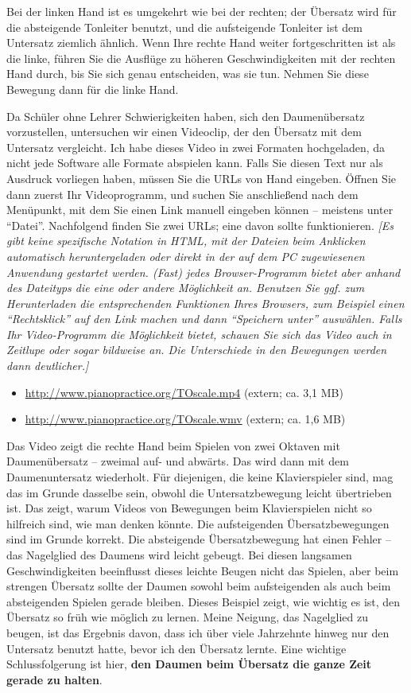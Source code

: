 Bei der linken Hand ist es umgekehrt wie bei der rechten; der Übersatz wird für die absteigende Tonleiter benutzt, und die aufsteigende Tonleiter ist dem Untersatz ziemlich ähnlich.
Wenn Ihre rechte Hand weiter fortgeschritten ist als die linke, führen Sie die Ausflüge zu höheren Geschwindigkeiten mit der rechten Hand durch, bis Sie sich genau entscheiden, was sie tun.
Nehmen Sie diese Bewegung dann für die linke Hand.

Da Schüler ohne Lehrer Schwierigkeiten haben, sich den Daumenübersatz vorzustellen, untersuchen wir einen Videoclip, der den Übersatz mit dem Untersatz vergleicht.
Ich habe dieses Video in zwei Formaten hochgeladen, da nicht jede Software alle Formate abspielen kann.
Falls Sie diesen Text nur als Ausdruck vorliegen haben, müssen Sie die URLs von Hand eingeben.
Öffnen Sie dann zuerst Ihr Videoprogramm, und suchen Sie anschließend nach dem Menüpunkt, mit dem Sie einen Link manuell eingeben können -- meistens unter \enquote{Datei}.
Nachfolgend finden Sie zwei URLs; eine davon sollte funktionieren.
\textit{[Es gibt keine spezifische Notation in HTML, mit der Dateien beim Anklicken automatisch heruntergeladen oder direkt in der auf dem PC zugewiesenen Anwendung gestartet werden.
(Fast) jedes Browser-Programm bietet aber anhand des Dateityps die eine oder andere Möglichkeit an.
Benutzen Sie ggf. zum Herunterladen die entsprechenden Funktionen Ihres Browsers, zum Beispiel einen \enquote{Rechtsklick} auf den Link machen und dann \enquote{Speichern unter} auswählen.
Falls Ihr Video-Programm die Möglichkeit bietet, schauen Sie sich das Video auch in Zeitlupe oder sogar bildweise an.  Die Unterschiede in den Bewegungen werden dann deutlicher.]}

\begin{itemize} 
 \item \url{http://www.pianopractice.org/TOscale.mp4} (extern; ca. 3,1 MB)
 \item \url{http://www.pianopractice.org/TOscale.wmv} (extern; ca. 1,6 MB)
\end{itemize}

Das Video zeigt die rechte Hand beim Spielen von zwei Oktaven mit Daumenübersatz -- zweimal auf- und abwärts.
Das wird dann mit dem Daumenuntersatz wiederholt.
Für diejenigen, die keine Klavierspieler sind, mag das im Grunde dasselbe sein, obwohl die Untersatzbewegung leicht übertrieben ist.
Das zeigt, warum Videos von Bewegungen beim Klavierspielen nicht so hilfreich sind, wie man denken könnte.
Die aufsteigenden Übersatzbewegungen sind im Grunde korrekt.
Die absteigende Übersatzbewegung hat einen Fehler -- das Nagelglied des Daumens wird leicht gebeugt.
Bei diesen langsamen Geschwindigkeiten beeinflusst dieses leichte Beugen nicht das Spielen, aber beim strengen Übersatz sollte der Daumen sowohl beim aufsteigenden als auch beim absteigenden Spielen gerade bleiben.
Dieses Beispiel zeigt, wie wichtig es ist, den Übersatz so früh wie möglich zu lernen.
Meine Neigung, das Nagelglied zu beugen, ist das Ergebnis davon, dass ich über viele Jahrzehnte hinweg nur den Untersatz benutzt hatte, bevor ich den Übersatz lernte.
Eine wichtige Schlussfolgerung ist hier, \textbf{den Daumen beim Übersatz die ganze Zeit gerade zu halten}.



